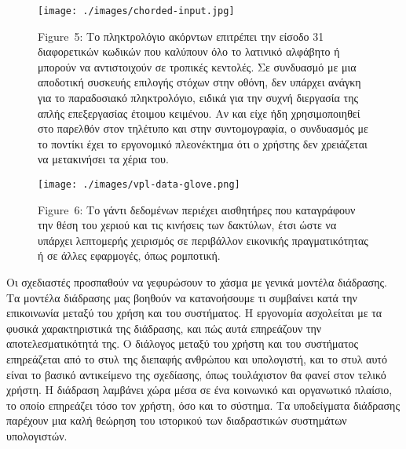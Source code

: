 \documentclass[
]{article}
\begin{document}
\leavevmode{}%
\begin{figure}
\hypertarget{fig:chorded-input}{%
\centering
\texttt{[image: ./images/chorded-input.jpg]}
\caption{Figure~5: Το πληκτρολόγιο ακόρντων επιτρέπει την είσοδο 31
διαφορετικών κωδικών που καλύπουν όλο το λατινικό αλφάβητο ή μπορούν να
αντιστοιχούν σε τροπικές κεντολές. Σε συνδυασμό με μια αποδοτική
συσκευής επιλογής στόχων στην οθόνη, δεν υπάρχει ανάγκη για το
παραδοσιακό πληκτρολόγιο, ειδικά για την συχνή διεργασία της απλής
επεξεργασίας έτοιμου κειμένου. Αν και είχε ήδη χρησιμοποιηθεί στο
παρελθόν στον τηλέτυπο και στην συντομογραφία, ο συνδυασμός με το
ποντίκι έχει το εργονομικό πλεονέκτημα ότι ο χρήστης δεν χρειάζεται να
μετακινήσει τα χέρια του.}\label{fig:chorded-input}
}
\end{figure}

\leavevmode{}%
\begin{figure}
\hypertarget{fig:vpl-data-glove}{%
\centering
\texttt{[image: ./images/vpl-data-glove.png]}
\caption{Figure~6: Το γάντι δεδομένων περιέχει αισθητήρες που
καταγράφουν την θέση του χεριού και τις κινήσεις των δακτύλων, έτσι ώστε
να υπάρχει λεπτομερής χειρισμός σε περιβάλλον εικονικής πραγματικότητας
ή σε άλλες εφαρμογές, όπως ρομποτική.}\label{fig:vpl-data-glove}
}
\end{figure}

Οι σχεδιαστές προσπαθούν να γεφυρώσουν το χάσμα με γενικά μοντέλα
διάδρασης. Τα μοντέλα διάδρασης μας βοηθούν να κατανοήσουμε τι συμβαίνει
κατά την επικοινωνία μεταξύ του χρήση και του συστήματος. Η εργονομία
ασχολείται με τα φυσικά χαρακτηριστικά της διάδρασης, και πώς αυτά
επηρεάζουν την αποτελεσματικότητά της. Ο διάλογος μεταξύ του χρήστη και
του συστήματος επηρεάζεται από το στυλ της διεπαφής ανθρώπου και
υπολογιστή, και το στυλ αυτό είναι το βασικό αντικείμενο της σχεδίασης,
όπως τουλάχιστον θα φανεί στον τελικό χρήστη. Η διάδραση λαμβάνει χώρα
μέσα σε ένα κοινωνικό και οργανωτικό πλαίσιο, το οποίο επηρεάζει τόσο
τον χρήστη, όσο και το σύστημα. Τα υποδείγματα διάδρασης παρέχουν μια
καλή θεώρηση του ιστορικού των διαδραστικών συστημάτων υπολογιστών.
\end{document}
